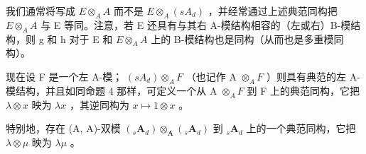 我们通常将写成 \(E \otimes_{A} A\) 而不是 \(E \otimes_{A} (s A_{d})\) ，并经常通过上述典范同构把 \(E \otimes_{A} A\) 与 E 等同。注意，若 E 还具有与其右 A-模结构相容的（左或右）B-模结构，则 g 和 h 对于 E 和 \(E \otimes_{A} A\) 上的 B-模结构也是同构（从而也是多重模同构）。

现在设 F 是一个左 A-模； \((sA_{d}) \otimes_{A} F\) （也记作 A \(\otimes_{A} F\) ）则具有典范的左 A-模结构，并且如同命题 4 那样，可定义一个从 A \(\otimes_{A} F\) 到 F 上的典范同构，它把 \(\lambda \otimes x\) 映为 \(\lambda x\) ，其逆同构为 \(x \mapsto 1 \otimes x\) 。

特别地，存在 (A, A)-双模 \((_{s}\mathbf{A}_{d})\otimes_{\mathbf{A}}(_{s}\mathbf{A}_{d})\) 到 \({}_{s}\mathbf{A}_{d}\) 上的一个典范同构，它把 \(\lambda \otimes \mu\) 映为 \(\lambda \mu\) 。

